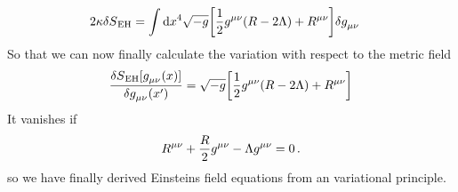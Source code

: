 \begin{equation}
\begin{split}
2\kappa\delta S\textsubscript{EH}
&=\int\dif x^4\sqrt{-g}\left[
\frac{1}{2}\tensor{g}{^\mu^\nu}
(R-2\Lambda)+\tensor{R}{^\mu^\nu}\right]\delta\tensor{g}{_\mu_\nu}
\end{split}
\end{equation}
So that we can now finally calculate the variation with respect to the metric
field
\begin{equation}
\frac{\delta
S\textsubscript{EH}[\tensor{g}{_\mu_\nu}(x)]}{\delta\tensor{g}{_\mu_\nu}(x')}
=\sqrt{-g}\left[\frac{1}{2}\tensor{g}{^\mu^\nu}
(R-2\Lambda)+\tensor{R}{^\mu^\nu}\right]
\end{equation}
It vanishes if 
\begin{equation}
\tensor{R}{^\mu^\nu}+\frac{R}{2}\tensor{g}{^\mu^\nu}
-\Lambda\tensor{g}{^\mu^\nu}=0\, .
\end{equation}
so we have finally derived Einsteins field equations from an variational
principle.
